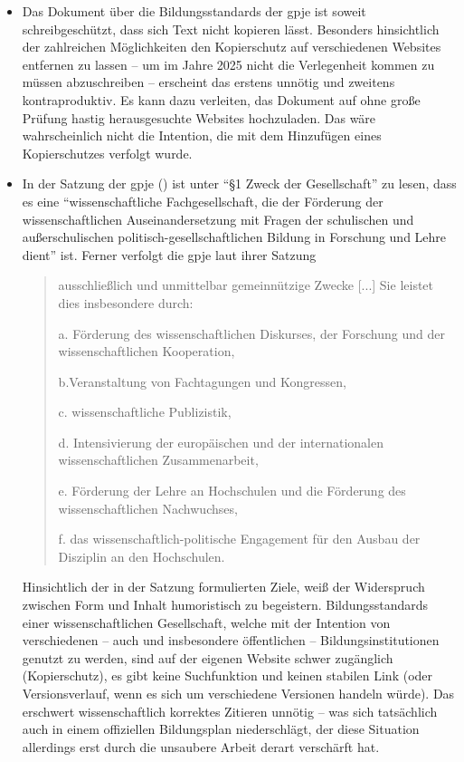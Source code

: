 \begin{itemize}
    \item Das Dokument über die Bildungsstandards der \gls{gpje} ist soweit schreibgeschützt, dass sich Text nicht kopieren lässt. Besonders hinsichtlich der zahlreichen Möglichkeiten den Kopierschutz auf verschiedenen Websites entfernen zu lassen -- um im Jahre 2025 nicht die Verlegenheit kommen zu müssen abzuschreiben -- erscheint das erstens unnötig und zweitens kontraproduktiv. Es kann dazu verleiten, das Dokument auf ohne große Prüfung hastig herausgesuchte Websites hochzuladen. Das wäre wahrscheinlich nicht die Intention, die mit dem Hinzufügen eines Kopierschutzes verfolgt wurde.
    
    \item In der Satzung der \gls{gpje} (\citeyear[]{gpje.satzung}) ist unter \enquote{\S 1 Zweck der Gesellschaft} zu lesen, dass es eine \enquote{wissenschaftliche Fachgesellschaft, die der Förderung der wissenschaftlichen Auseinandersetzung mit Fragen der schulischen und außerschulischen politisch-gesellschaftlichen Bildung in Forschung und Lehre dient} ist.
    Ferner verfolgt die \gls{gpje} laut ihrer Satzung \blockquote{ausschließlich und unmittelbar gemeinnützige Zwecke [...] Sie leistet dies insbesondere durch:
    
    a. Förderung des wissenschaftlichen Diskurses, der Forschung und der wissenschaftlichen Kooperation,
    
    b.Veranstaltung von Fachtagungen und Kongressen,
    
    c. wissenschaftliche Publizistik,
    
    d. Intensivierung der europäischen und der internationalen wissenschaftlichen Zusammenarbeit,
    
    e. Förderung der Lehre an Hochschulen und die Förderung des wissenschaftlichen Nachwuchses,
    
    f. das wissenschaftlich-politische Engagement für den Ausbau der Disziplin an den Hochschulen.}

    Hinsichtlich der in der Satzung formulierten Ziele, weiß der Widerspruch zwischen Form und Inhalt humoristisch zu begeistern. Bildungsstandards einer wissenschaftlichen Gesellschaft, welche mit der Intention von verschiedenen -- auch und insbesondere öffentlichen -- Bildungsinstitutionen genutzt zu werden, sind auf der eigenen Website schwer zugänglich (Kopierschutz), es gibt keine Suchfunktion und keinen stabilen Link (oder Versionsverlauf, wenn es sich um verschiedene Versionen handeln würde). Das erschwert wissenschaftlich korrektes Zitieren unnötig -- was sich tatsächlich auch in einem offiziellen Bildungsplan \autocite[][9]{bplan} niederschlägt, der diese Situation allerdings erst durch die unsaubere Arbeit derart verschärft hat. 
    

\end{itemize}
